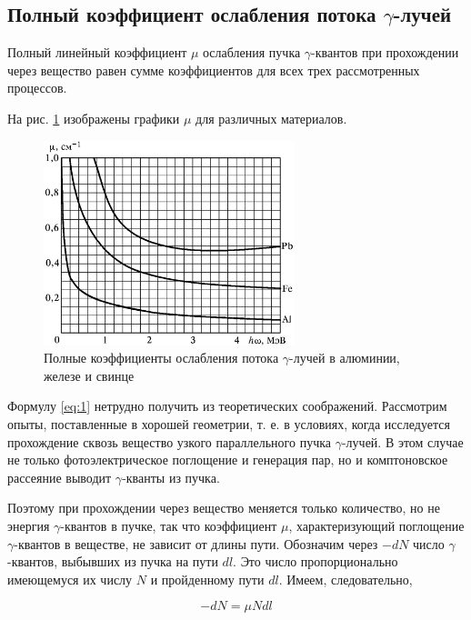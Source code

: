 \documentclass[a4paper,12pt]{article}
\begin{document}
\subsection*{Полный коэффициент ослабления потока $\gamma$-лучей}

Полный линейный коэффициент $\mu$ ослабления пучка $\gamma$-квантов при прохождении через вещество равен сумме коэффициентов для всех трех рассмотренных процессов.

На рис. \ref{pic:mu_for_materials} изображены графики $\mu$ для различных материалов.

\begin{figure}[h]
    \begin{center}
        \includegraphics[width = 0.65\textwidth]{pictures/mu_for_Al_Fe_Pb.png}
        \caption{Полные коэффициенты ослабления потока $\gamma$-лучей в алюминии, железе и свинце}
    \label{pic:mu_for_materials}
    \end{center}
\end{figure}

Формулу \eqref{eq:1} нетрудно получить из теоретических соображений. Рассмотрим опыты, поставленные в хорошей геометрии, т. е. в условиях, когда исследуется прохождение сквозь вещество узкого параллельного пучка $\gamma$-лучей. В этом случае не только фотоэлектрическое поглощение и генерация пар, но и комптоновское рассеяние выводит $\gamma$-кванты из пучка.

Поэтому при прохождении через вещество меняется только количество, но не энергия $\gamma$-квантов в пучке, так что коэффициент $\mu$, характеризующий поглощение $\gamma$-квантов в веществе, не зависит от длины пути. Обозначим через $-dN$ число $\gamma$-квантов, выбывших из пучка на пути $dl$. Это число пропорционально имеющемуся их числу $N$ и пройденному пути $dl$. Имеем, следовательно,

\begin{equation}\label{eq:8}
    -dN = \mu N  dl
\end{equation}
\end{document}
